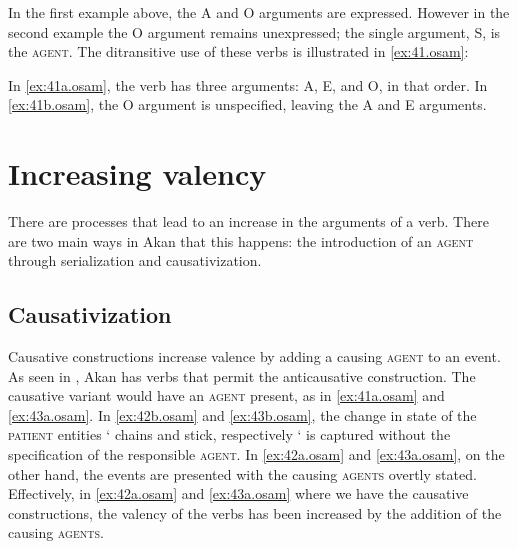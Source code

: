 \documentclass[output=paper]{langsci/langscibook}
\begin{document}
In the first example above, the A and O arguments are expressed. However in the second example the O argument remains unexpressed; the single argument, S, is the \textsc{agent}. The ditransitive use of these verbs is illustrated in \ref{ex:41.osam}:


\ea
\label{ex:41.osam}
	\z

	\z
\z

In \ref{ex:41a.osam}, the verb has three arguments: A, E, and O, in that order. In \ref{ex:41b.osam}, the O argument is unspecified, leaving the A and E arguments.

\section{Increasing valency}\label{§5:increasing.osam}

There are processes that lead to an increase in the arguments of a verb. There are two main ways in Akan that this happens: the introduction of an \textsc{agent} through serialization and causativization.

\subsection{Causativization}\label{§5.1:causativization.osam}

Causative constructions increase valence by adding a causing \textsc{agent} to an event. As seen in , Akan has verbs that permit the anticausative construction. The causative variant would have an \textsc{agent} present, as in \ref{ex:41a.osam} and \ref{ex:43a.osam}. In \ref{ex:42b.osam} and \ref{ex:43b.osam}, the change in state of the \textsc{patient} entities ` chains and stick, respectively ` is captured without the specification of the responsible \textsc{agent}. In \ref{ex:42a.osam} and \ref{ex:43a.osam}, on the other hand, the events are presented with the causing \textsc{agents} overtly stated. Effectively, in \ref{ex:42a.osam} and \ref{ex:43a.osam} where we have the causative constructions, the valency of the verbs has been increased by the addition of the causing \textsc{agents}.
\end{document}
